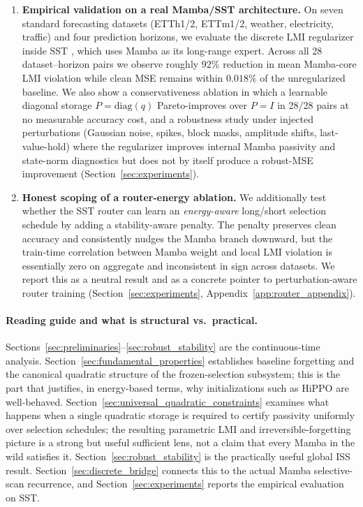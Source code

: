 \documentclass[10pt]{article} %
\theoremstyle{definition}
\begin{document}
\begin{enumerate}
    \item \textbf{Empirical validation on a real Mamba/SST architecture.} On seven standard forecasting datasets (ETTh1/2, ETTm1/2, weather, electricity, traffic) and four prediction horizons, we evaluate the discrete LMI regularizer inside SST \citep{XiongxiaoXuSST}, which uses Mamba as its long-range expert. Across all 28 dataset--horizon pairs we observe roughly $92\%$ reduction in mean Mamba-core LMI violation while clean MSE remains within $0.018\%$ of the unregularized baseline. We also show a conservativeness ablation in which a learnable diagonal storage $P=\mathrm{diag}(q)$ Pareto-improves over $P=I$ in 28/28 pairs at no measurable accuracy cost, and a robustness study under injected perturbations (Gaussian noise, spikes, block masks, amplitude shifts, last-value-hold) where the regularizer improves internal Mamba passivity and state-norm diagnostics but does not by itself produce a robust-MSE improvement (Section~\ref{sec:experiments}).
    \item \textbf{Honest scoping of a router-energy ablation.} We additionally test whether the SST router can learn an \emph{energy-aware} long/short selection schedule by adding a stability-aware penalty. The penalty preserves clean accuracy and consistently nudges the Mamba branch downward, but the train-time correlation between Mamba weight and local LMI violation is essentially zero on aggregate and inconsistent in sign across datasets. We report this as a neutral result and as a concrete pointer to perturbation-aware router training (Section~\ref{sec:experiments}, Appendix~\ref{app:router_appendix}).
\end{enumerate}

\paragraph{Reading guide and what is structural vs.\ practical.}
Sections~\ref{sec:preliminaries}--\ref{sec:robust_stability} are the continuous-time analysis. Section~\ref{sec:fundamental_properties} establishes baseline forgetting and the canonical quadratic structure of the frozen-selection subsystem; this is the part that justifies, in energy-based terms, why initializations such as HiPPO are well-behaved. Section~\ref{sec:universal_quadratic_constraints} examines what happens when a single quadratic storage is required to certify passivity uniformly over selection schedules; the resulting parametric LMI and irreversible-forgetting picture is a strong but useful sufficient lens, not a claim that every Mamba in the wild satisfies it. Section~\ref{sec:robust_stability} is the practically useful global ISS result. Section~\ref{sec:discrete_bridge} connects this to the actual Mamba selective-scan recurrence, and Section~\ref{sec:experiments} reports the empirical evaluation on SST.
\end{document}
